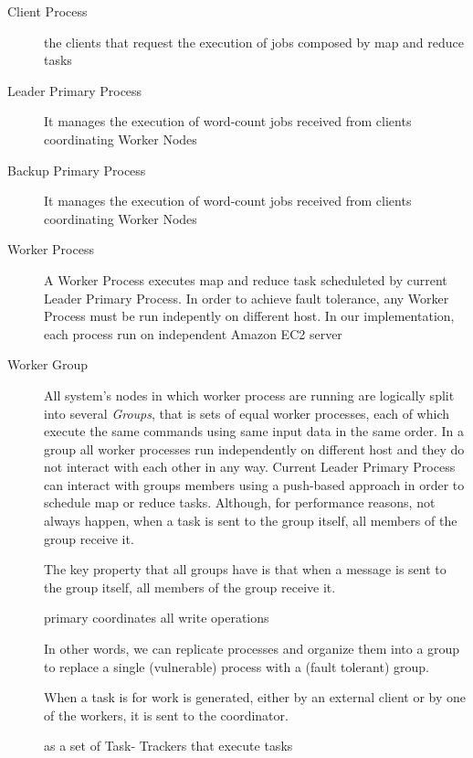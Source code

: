 \documentclass[sigchi]{acmart}
\begin{document}
\begin{description}
\item[Client Process] the clients that request the execution of jobs composed by map and reduce tasks

\item[Leader Primary Process] It manages the execution of word-count jobs received from clients coordinating Worker Nodes 

\item[Backup Primary Process] It manages the execution of word-count jobs received from clients coordinating Worker Nodes 

\item[Worker Process] A Worker Process executes map and reduce task scheduleted by current Leader Primary Process. In order to achieve fault tolerance, any Worker Process must be run indepently on different host. In our implementation, each process run on independent Amazon EC2 server

\item[Worker Group] All system's nodes in which worker process are running are logically split into several \textit{Groups}, that is sets of equal worker processes, each of which execute the same commands using same input data in the same order. In a group all worker processes run independently on different host and they do not interact with each other in any way. Current Leader Primary Process can interact with groups members using a push-based approach in order to schedule map or reduce tasks. Although, for performance reasons, not always happen, when a task is sent to the group itself, all members of the group receive it.



The key property that all groups have is that when a
message is sent to the group itself, all members of the group receive it.


 primary coordinates all write
operations


 In other words, we can replicate processes and organize them into a group to replace a single (vulnerable) process with a (fault tolerant) group.



 When a task is  for work is generated, either
by an external client or by one of the workers, it is sent to the coordinator.





as  a set of Task- Trackers that execute tasks
\end{description}
\end{document}
